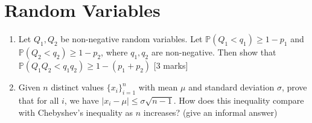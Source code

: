 \documentclass[12pt]{article}
\begin{document}
\newpage
\section{Random Variables}
\begin{enumerate} \item Let $Q_1, Q_2$ be non-negative random variables. Let $\mathbb{P}(Q_1 < q_1) \geq 1-p_1$ and $\mathbb{P}(Q_2 < q_2) \geq 1-p_2$, where $q_1, q_2$ are non-negative. Then show that $\mathbb{P}(Q_1Q_2 < q_1q_2) \geq 1 - (p_1 + p_2)$ [3 marks]

    \item Given $n$ distinct values $\{x_i\}_{i=1}^n$ with mean $\mu$ and standard deviation $\sigma$, prove that for all $i$, we have $|x_i - \mu| \leq \sigma\sqrt{n - 1}$. How does this inequality compare with Chebyshev's inequality as $n$ increases? (give an informal answer) \end{enumerate}
\end{document}
